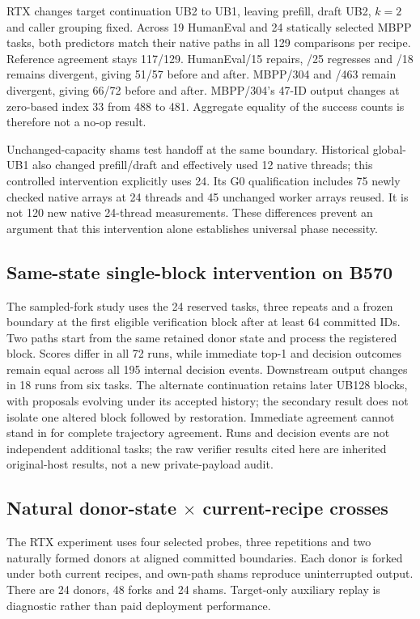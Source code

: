 RTX changes target continuation UB2 to UB1, leaving prefill, draft UB2, $k=2$ and caller grouping fixed. Across 19 HumanEval and 24 statically selected MBPP tasks, both predictors match their native paths in all 129 comparisons per recipe. Reference agreement stays 117/129. HumanEval/15 repairs, /25 regresses and /18 remains divergent, giving 51/57 before and after. MBPP/304 and /463 remain divergent, giving 66/72 before and after. MBPP/304's 47-ID output changes at zero-based index 33 from 488 to 481. Aggregate equality of the success counts is therefore not a no-op result.

Unchanged-capacity shams test handoff at the same boundary. Historical global-UB1 also changed prefill/draft and effectively used 12 native threads; this controlled intervention explicitly uses 24. Its G0 qualification includes 75 newly checked native arrays at 24 threads and 45 unchanged worker arrays reused. It is not 120 new native 24-thread measurements. These differences prevent an argument that this intervention alone establishes universal phase necessity.

\subsection{Same-state single-block intervention on B570}
The sampled-fork study uses the 24 reserved tasks, three repeats and a frozen boundary at the first eligible verification block after at least 64 committed IDs. Two paths start from the same retained donor state and process the registered block. Scores differ in all 72 runs, while immediate top-1 and decision outcomes remain equal across all 195 internal decision events. Downstream output changes in 18 runs from six tasks. The alternate continuation retains later UB128 blocks, with proposals evolving under its accepted history; the secondary result does not isolate one altered block followed by restoration. Immediate agreement cannot stand in for complete trajectory agreement. Runs and decision events are not independent additional tasks; the raw verifier results cited here are inherited original-host results, not a new private-payload audit.

\subsection{Natural donor-state $\times$ current-recipe crosses}
The RTX experiment uses four selected probes, three repetitions and two naturally formed donors at aligned committed boundaries. Each donor is forked under both current recipes, and own-path shams reproduce uninterrupted output. There are 24 donors, 48 forks and 24 shams. Target-only auxiliary replay is diagnostic rather than paid deployment performance.

